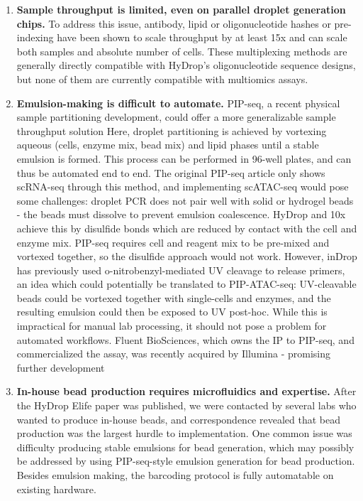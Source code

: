 \begin{enumerate}
	\item \textbf{Sample throughput is limited, even on parallel droplet generation chips.} To address this issue, antibody, lipid or oligonucleotide hashes or pre-indexing have been shown to scale throughput by at least 15x and can scale both samples and absolute number of cells. These multiplexing methods are generally directly compatible with HyDrop's oligonucleotide sequence designs, but none of them are currently compatible with multiomics assays.
	\item \textbf{Emulsion-making is difficult to automate.} PIP-seq, a recent physical sample partitioning development, could offer a more generalizable sample throughput solution Here, droplet partitioning is achieved by vortexing aqueous (cells, enzyme mix, bead mix) and lipid phases until a stable emulsion is formed. This process can be performed in 96-well plates, and can thus be automated end to end. The original PIP-seq article only shows scRNA-seq through this method, and implementing scATAC-seq would pose some challenges: droplet PCR does not pair well with solid or hydrogel beads - the beads must dissolve to prevent emulsion coalescence. HyDrop and 10x achieve this by disulfide bonds which are reduced by contact with the cell and enzyme mix. PIP-seq requires cell and reagent mix to be pre-mixed and vortexed together, so the disulfide approach would not work. However, inDrop has previously used o-nitrobenzyl-mediated UV cleavage to release primers, an idea which could potentially be translated to PIP-ATAC-seq: UV-cleavable beads could be vortexed together with single-cells and enzymes, and the resulting emulsion could then be exposed to UV post-hoc. While this is impractical for manual lab processing, it should not pose a problem for automated workflows. Fluent BioSciences, which owns the IP to PIP-seq, and commercialized the assay, was recently acquired by Illumina - promising further development
	\item \textbf{In-house bead production requires microfluidics and expertise.} After the HyDrop Elife paper was published, we were contacted by several labs who wanted to produce in-house beads, and correspondence revealed that bead production was the largest hurdle to implementation. One common issue was difficulty producing stable emulsions for bead generation, which may possibly be addressed by using PIP-seq-style emulsion generation for bead production. Besides emulsion making, the barcoding protocol is fully automatable on existing hardware.
\end{enumerate}

